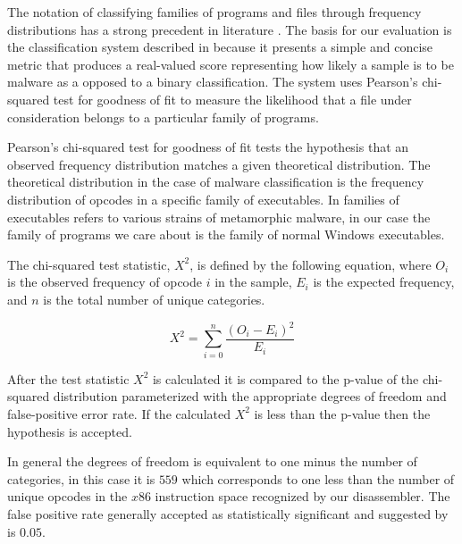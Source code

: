     The notation of classifying families of programs and files through frequency
    distributions has a strong precedent in literature
    \cite{chisquared,hmm_evade,stat_model,fileprints}. The basis for our
    evaluation is the classification system described in \cite{chisquared}
    because it presents a simple and concise metric that produces a real-valued
    score representing how likely a sample is to be malware as a opposed to a
    binary classification. The system uses Pearson's chi-squared test for
    goodness of fit to measure the likelihood that a file under consideration
    belongs to a particular family of programs.

    Pearson's chi-squared test for goodness of fit tests the hypothesis that
    an observed frequency distribution matches a given theoretical
    distribution. The theoretical distribution in the case of malware
    classification is the frequency distribution of opcodes in a specific
    family of executables. In \cite{chisquared} families of executables
    refers to various strains of metamorphic malware, in our case the family
    of programs we care about is the family of normal Windows executables.
    

    The chi-squared test statistic, $X^2$, is defined by the following
    equation, where $O_i$ is the observed frequency of opcode $i$ in the
    sample, $E_i$ is the expected frequency, and $n$ is the total number of
    unique categories.

    $$X^2 = \sum_{i=0}^{n} \frac{(O_i - E_i)^2}{E_i}$$

    After the test statistic $X^2$ is calculated it is compared to the
    p-value of the chi-squared distribution parameterized with the
    appropriate degrees of freedom and false-positive error rate. If the
    calculated $X^2$ is less than the p-value then the hypothesis is
    accepted.

    In general the degrees of freedom is equivalent to one minus the number of
    categories, in this case it is $559$ which corresponds to one less than the
    number of unique opcodes in the $x86$ instruction space recognized by our
    disassembler. The false positive rate generally accepted as statistically
    significant and suggested by \cite{chisquared} is $0.05$.

